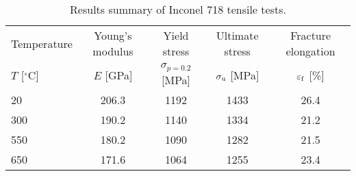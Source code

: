 \begin{table}[htbp]
  \centering
  \caption{Results summary of Inconel 718 tensile tests.}
    \begin{tabular}{lcccc}
    \toprule
    Temperature         & Young's modulus   & Yield stress            & Ultimate stress     & Fracture elongation\\
    $T$ [$^{\circ}$C]   & $E$ [GPa]         & $\sigma_{p=0.2}$ [MPa]  & $\sigma_{\rm u}$ [MPa]    & $\varepsilon_{\rm f}$ [\%]\\
    \midrule
    20    & 206.3 & 1192 & 1433 & 26.4 \\
    300   & 190.2 & 1140 & 1334 & 21.2 \\
    550   & 180.2 & 1090 & 1282 & 21.5 \\
    650   & 171.6 & 1064 & 1255 & 23.4 \\
    \bottomrule
    \end{tabular}%
  \label{tab:General_material_mechanical_properties}%
\end{table}%

%
%
%

